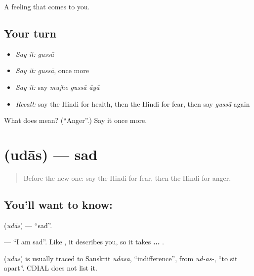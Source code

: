 \begin{grammarlens}[title={What you've built}]
A feeling that comes to you.
\end{grammarlens}

\subsection*{Your turn}
\begin{itemize}
\raggedright
  \item \emph{Say it:} \emph{gussā}
  \item \emph{Say it:} \emph{gussā}, once more
  \item \emph{Say it:} say \emph{mujhe gussā āyā}
  \item \emph{Recall:} say the Hindi for health, then the Hindi for fear, then say \emph{gussā} again
\end{itemize}

\begin{tcolorbox}[breakable,colback=teal!4,colframe=teal!35!black,title={Before you move on}]
What does  mean? (\textquotedblleft{}Anger\textquotedblright{}.) Say it once more.
\end{tcolorbox}
\section[\texorpdfstring{\hi{उदास} (udās)}{उदास (udās)}]{ (udās) — sad}

\label{lesson:HI-C108-udas}



\begin{quote}
Before the new one: say the Hindi for fear, then the Hindi for anger.
\end{quote}

\subsection*{You'll want to know: }
\textbf{} (\emph{udās}) — \textquotedblleft{}sad\textquotedblright{}.

\textbf{  } — \textquotedblleft{}I am sad\textquotedblright{}. Like \textbf{}, it describes you, so it takes \textbf{ ... }.

\begin{cousinweb}
\textbf{} (\emph{udās}) is usually traced to Sanskrit \emph{udāsa}, \textquotedblleft{}indifference\textquotedblright{}, from \emph{ud-ās-}, \textquotedblleft{}to sit apart\textquotedblright{}. CDIAL does not list it.
\end{cousinweb}

